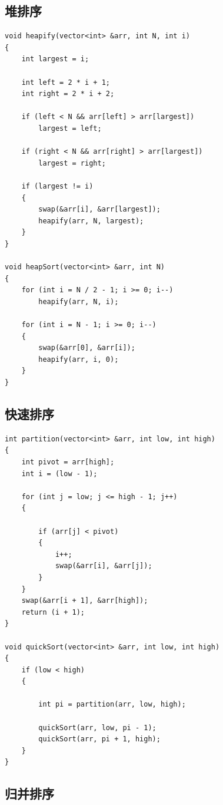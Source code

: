 \documentclass[12pt, a4paper, oneside]{ctexart}
\begin{document}
\subsection{堆排序}

\begin{lstlisting}
void heapify(vector<int> &arr, int N, int i)
{
	int largest = i;

	int left = 2 * i + 1;
	int right = 2 * i + 2;

	if (left < N && arr[left] > arr[largest])
		largest = left;

	if (right < N && arr[right] > arr[largest])
		largest = right;

	if (largest != i)
	{
		swap(&arr[i], &arr[largest]);
		heapify(arr, N, largest);
	}
}
	
void heapSort(vector<int> &arr, int N)
{
	for (int i = N / 2 - 1; i >= 0; i--)
		heapify(arr, N, i);

	for (int i = N - 1; i >= 0; i--)
	{
		swap(&arr[0], &arr[i]);
		heapify(arr, i, 0);
	}
}
\end{lstlisting}



\subsection{快速排序}


\begin{lstlisting}
int partition(vector<int> &arr, int low, int high)
{
    int pivot = arr[high];
    int i = (low - 1);

    for (int j = low; j <= high - 1; j++)
    {

        if (arr[j] < pivot)
        {
            i++;
            swap(&arr[i], &arr[j]);
        }
    }
    swap(&arr[i + 1], &arr[high]);
    return (i + 1);
}

void quickSort(vector<int> &arr, int low, int high)
{
    if (low < high)
    {

        int pi = partition(arr, low, high);

        quickSort(arr, low, pi - 1);
        quickSort(arr, pi + 1, high);
    }
}
\end{lstlisting}
\subsection{归并排序}
\end{document}
